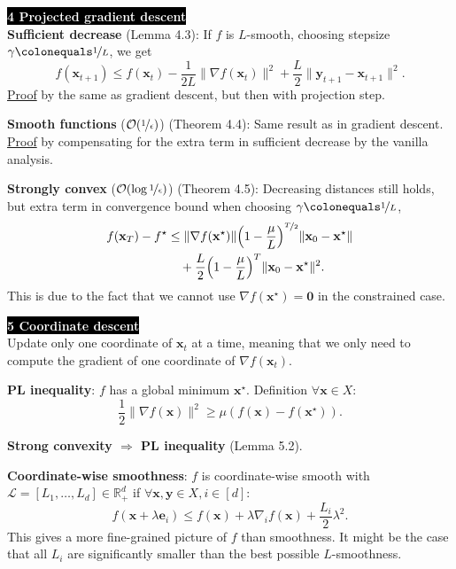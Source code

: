 \documentclass{article}
\newcommand{\lft}{\mathopen{}\mathclose\bgroup\left}
\newcommand{\rgt}{\aftergroup\egroup\right}
\newcommand{\R}{\mathbb{R}}
\renewcommand{\vec}[1]{\mathbf{#1}}
\newenvironment{topic}[1]
{\textbf{\sffamily \colorbox{black}{\textcolor{white}{#1}}} \\ \vspace{0.2cm}}
{}
\begin{document}
\begin{multicols*}{3}
\begin{topic}{4 Projected gradient descent}
        \textbf{Sufficient decrease} (Lemma 4.3): If $f$ is $L$-smooth,
        choosing stepsize $\gamma \colonequals \nicefrac{1}{L}$, we get \[
            f(\vec{x}_{t+1}) \leq f(\vec{x}_t) - \frac{1}{2L} \| \nabla f(\vec{x}_t) \|^2 + \frac{L}{2} \| \vec{y}_{t+1} - \vec{x}_{t+1} \|^2.
        \]
        \underline{Proof} by the same as gradient descent, but then with projection step.

        \textbf{Smooth functions} ($\mathcal{O}(\nicefrac{1}{\epsilon})$) (Theorem 4.4): Same result
        as in gradient descent. \underline{Proof} by compensating for the extra term in sufficient
        decrease by the vanilla analysis.

        \textbf{Strongly convex} ($\mathcal{O}(\log \nicefrac{1}{\epsilon})$) (Theorem 4.5):
        Decreasing distances still holds, but extra term in convergence bound when choosing
        $\gamma \colonequals \nicefrac{1}{L}$,
        \begin{align*}
            f(\vec{x}_T) - f^\star & \leq \| \nabla f(\vec{x}^\star) \| \lft( 1 - \frac{\mu}{L} \rgt)^{\nicefrac{T}{2}} \| \vec{x}_0 - \vec{x}^\star \| \\
                                   & \quad + \frac{L}{2} \lft( 1 - \frac{\mu}{L} \rgt)^T \| \vec{x}_0 - \vec{x}^\star \|^2.
        \end{align*}
        This is due to the fact that we cannot use $\nabla f(\vec{x}^\star) = \vec{0}$ in the constrained
        case.
    \end{topic}

    \begin{topic}{5 Coordinate descent}
        Update only one coordinate of $\vec{x}_t$ at a time, meaning that we only need to compute the
        gradient of one coordinate of $\nabla f(\vec{x}_t)$.

        \textbf{PL inequality}: $f$ has a global minimum $\vec{x}^\star$. Definition $\forall \vec{x}
            \in X$: \[
            \frac{1}{2} \| \nabla f(\vec{x}) \|^2 \geq \mu (f(\vec{x}) - f(\vec{x}^\star)).
        \]

        \textbf{Strong convexity $\Rightarrow$ PL inequality} (Lemma 5.2).

        \textbf{Coordinate-wise smoothness}: $f$ is coordinate-wise smooth with $\mathcal{L} =
            [L_1, \ldots, L_d] \in \R_+^d$ if $\forall \vec{x}, \vec{y} \in X, i \in [d]$: \[
            f(\vec{x} + \lambda \vec{e}_i) \leq f(\vec{x}) + \lambda \nabla_i f(\vec{x}) + \frac{L_i}{2} \lambda^2.
        \]
        This gives a more fine-grained picture of $f$ than smoothness. It might be the case that all $L_i$
        are significantly smaller than the best possible $L$-smoothness.


\end{topic}
\end{multicols*}
\end{document}
